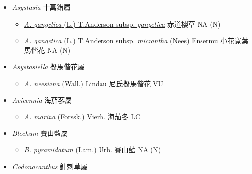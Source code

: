 
  \begin{itemize}
 \item[] \textit{Asystasia} 十萬錯屬
                                
  \begin{itemize}
        \item[] \href{http://www.theplantlist.org/tpl1.1/search?q=Asystasia+gangetica+subsp.+gangetica}{\textit{A. gangetica} (L.) T.Anderson subsp. \textit{gangetica}}   赤道櫻草   NA (N)
        \item[] \href{http://www.theplantlist.org/tpl1.1/search?q=Asystasia+gangetica+subsp.+micrantha}{\textit{A. gangetica} (L.) T.Anderson subsp. \textit{micrantha} (Nees) Ensermu}   小花寬葉馬偕花   NA (N)
  \end{itemize}
 \item[] \textit{Asystasiella} 擬馬偕花屬
                                
  \begin{itemize}
        \item[] \href{http://www.theplantlist.org/tpl1.1/search?q=Asystasiella+neesiana}{\textit{A. neesiana} (Wall.) Lindau}   尼氏擬馬偕花   VU
  \end{itemize}
 \item[] \textit{Avicennia} 海茄苳屬
                                
  \begin{itemize}
        \item[] \href{http://www.theplantlist.org/tpl1.1/search?q=Avicennia+marina}{\textit{A. marina} (Forssk.) Vierh.}   海茄冬   LC
  \end{itemize}
 \item[] \textit{Blechum} 賽山藍屬
                                
  \begin{itemize}
        \item[] \href{http://www.theplantlist.org/tpl1.1/search?q=Blechum+pyramidatum}{\textit{B. pyramidatum} (Lam.) Urb.}   賽山藍   NA (N)
  \end{itemize}
 \item[] \textit{Codonacanthus} 針刺草屬
                                

\end{itemize}
